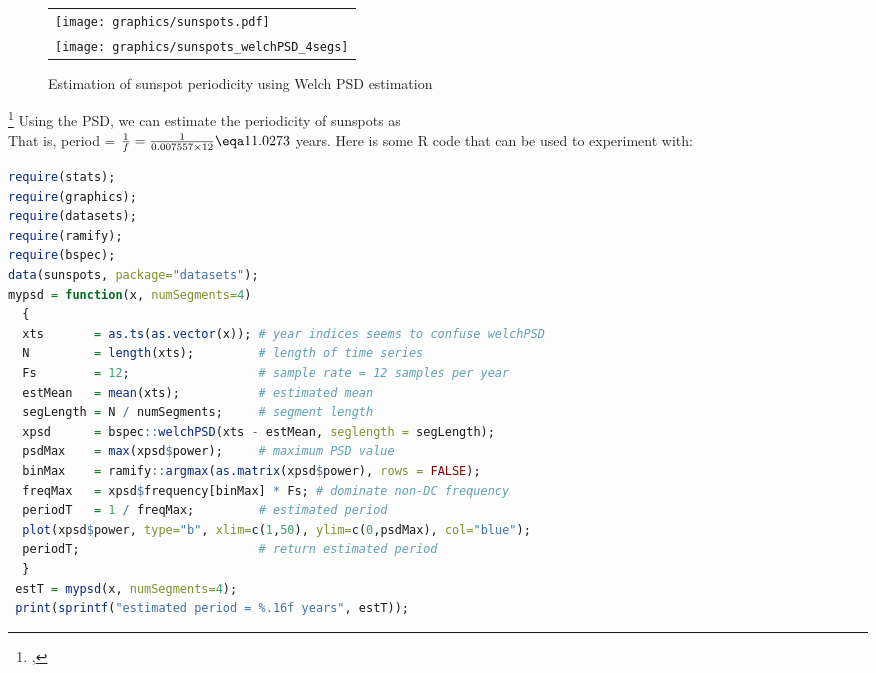 \begin{figure}
  \centering
  \begin{tabular}{l}
    \texttt{[image: graphics/sunspots.pdf]}\\
    \texttt{[image: graphics/sunspots\_welchPSD\_4segs]}
  \end{tabular}
  \caption{Estimation of sunspot periodicity using Welch PSD estimation\label{fig:sunspot_welch}}
\end{figure}
\begin{example}
\footnote{
  ,
  }
Using the PSD, we can estimate the periodicity of sunspots  as
\\
That is, period = $\frac{1}{f}=\frac{1}{0.007557\times12}\eqa11.0273$ years.
Here is some R code that can be used to experiment with:
\begin{lstlisting}[language=R]
require(stats);
require(graphics);
require(datasets);
require(ramify);
require(bspec);
data(sunspots, package="datasets");
mypsd = function(x, numSegments=4) 
  {
  xts       = as.ts(as.vector(x)); # year indices seems to confuse welchPSD
  N         = length(xts);         # length of time series
  Fs        = 12;                  # sample rate = 12 samples per year
  estMean   = mean(xts);           # estimated mean
  segLength = N / numSegments;     # segment length
  xpsd      = bspec::welchPSD(xts - estMean, seglength = segLength);
  psdMax    = max(xpsd$power);     # maximum PSD value
  binMax    = ramify::argmax(as.matrix(xpsd$power), rows = FALSE);
  freqMax   = xpsd$frequency[binMax] * Fs; # dominate non-DC frequency
  periodT   = 1 / freqMax;         # estimated period
  plot(xpsd$power, type="b", xlim=c(1,50), ylim=c(0,psdMax), col="blue");
  periodT;                         # return estimated period
  }
 estT = mypsd(x, numSegments=4);
 print(sprintf("estimated period = %.16f years", estT));
\end{lstlisting}
\end{example}

